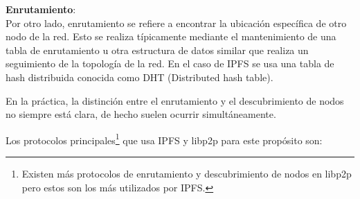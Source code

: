 \textbf{Enrutamiento}:
\\Por otro lado, enrutamiento se refiere a encontrar la ubicación específica de otro nodo de la red. Esto se realiza
típicamente mediante el mantenimiento de una tabla de enrutamiento u otra estructura de datos similar que realiza un
seguimiento de la topología de la red. En el caso de IPFS se usa una tabla de hash distribuida conocida como DHT (Distributed
hash table).

En la práctica, la distinción entre el enrutamiento y el descubrimiento de nodos no siempre está clara, de hecho suelen ocurrir simultáneamente.

Los protocolos principales\footnote{Existen más protocolos de enrutamiento y descubrimiento de nodos en libp2p pero estos son los más utilizados por IPFS.} que usa IPFS y libp2p para este propósito son:


